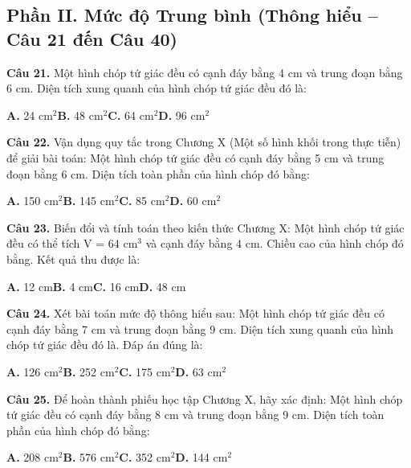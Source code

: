 \documentclass[11pt,a4paper]{article}
\begin{document}
\subsection*{\color{accent} Phần II. Mức độ Trung bình (Thông hiểu -- Câu 21 đến Câu 40)}
\textbf{\color{primary} Câu 21.} Một hình chóp tứ giác đều có cạnh đáy bằng 4 cm và trung đoạn bằng 6 cm. Diện tích xung quanh của hình chóp tứ giác đều đó là:\par
\hspace*{1.5em}\textbf{A.} 24 cm$^2$\quad\quad \textbf{B.} 48 cm$^2$\quad\quad \textbf{C.} 64 cm$^2$\quad\quad \textbf{D.} 96 cm$^2$\par\vspace{2pt}
\textbf{\color{primary} Câu 22.} Vận dụng quy tắc trong Chương X (Một số hình khối trong thực tiễn) để giải bài toán: Một hình chóp tứ giác đều có cạnh đáy bằng 5 cm và trung đoạn bằng 6 cm. Diện tích toàn phần của hình chóp đó bằng:\par
\hspace*{1.5em}\textbf{A.} 150 cm$^2$\quad\quad \textbf{B.} 145 cm$^2$\quad\quad \textbf{C.} 85 cm$^2$\quad\quad \textbf{D.} 60 cm$^2$\par\vspace{2pt}
\textbf{\color{primary} Câu 23.} Biến đổi và tính toán theo kiến thức Chương X: Một hình chóp tứ giác đều có thể tích V = 64 cm$^3$ và cạnh đáy bằng 4 cm. Chiều cao của hình chóp đó bằng. Kết quả thu được là:\par
\hspace*{1.5em}\textbf{A.} 12 cm\quad\quad \textbf{B.} 4 cm\quad\quad \textbf{C.} 16 cm\quad\quad \textbf{D.} 48 cm\par\vspace{2pt}
\textbf{\color{primary} Câu 24.} Xét bài toán mức độ thông hiểu sau: Một hình chóp tứ giác đều có cạnh đáy bằng 7 cm và trung đoạn bằng 9 cm. Diện tích xung quanh của hình chóp tứ giác đều đó là. Đáp án đúng là:\par
\hspace*{1.5em}\textbf{A.} 126 cm$^2$\quad\quad \textbf{B.} 252 cm$^2$\quad\quad \textbf{C.} 175 cm$^2$\quad\quad \textbf{D.} 63 cm$^2$\par\vspace{2pt}
\textbf{\color{primary} Câu 25.} Để hoàn thành phiếu học tập Chương X, hãy xác định: Một hình chóp tứ giác đều có cạnh đáy bằng 8 cm và trung đoạn bằng 9 cm. Diện tích toàn phần của hình chóp đó bằng:\par
\hspace*{1.5em}\textbf{A.} 208 cm$^2$\quad\quad \textbf{B.} 576 cm$^2$\quad\quad \textbf{C.} 352 cm$^2$\quad\quad \textbf{D.} 144 cm$^2$\par\vspace{2pt}
\end{document}
